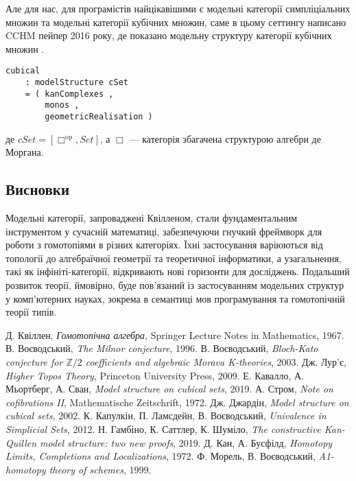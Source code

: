 \documentclass{article}
\begin{document}
Але для нас, для програмістів найцікавішими є модельні категорії симпліціальних множин та модельні категорії кубічних множин, саме в цьому сеттингу написано CCHM пейпер 2016 року, де показано модельну структуру категорії кубічних множин \cite{Cavallo19}.

\begin{lstlisting}
cubical
    : modelStructure cSet
    = ( kanComplexes ,
        monos ,
        geometricRealisation )
\end{lstlisting}

де $cSet = [\Box^{\mathrm{op}},Set]$, а $\Box$ — категорія збагачена структурою алгебри де Моргана.

\subsection{Висновки}
Модельні категорії, запроваджені Квілленом, стали фундаментальним інструментом у сучасній математиці, забезпечуючи гнучкий фреймворк для роботи з гомотопіями в різних категоріях. Їхні застосування варіюються від топології до алгебраїчної геометрії та теоретичної інформатики, а узагальнення, такі як інфініті-категорії, відкривають нові горизонти для досліджень. Подальший розвиток теорії, ймовірно, буде пов’язаний із застосуванням модельних структур у комп’ютерних науках, зокрема в семантиці мов програмування та гомотопічній теорії типів.

\begin{thebibliography}{9}
 Д. Квіллен, \emph{Гомотопічна алгебра}, Springer Lecture Notes in Mathematics, 1967.
 В. Воєводський, \emph{The Milnor conjecture}, 1996.
 В. Воєводський, \emph{Bloch-Kato conjecture for $\mathbb{Z}/2$ coefficients and algebraic Morava K-theories}, 2003.
 Дж. Лур’є, \emph{Higher Topos Theory}, Princeton University Press, 2009.
 Е. Кавалло, А. Мьортберг, А. Сван, \emph{Model structure on cubical sets}, 2019.
 А. Стром, \emph{Note on cofibrations II}, Mathematische Zeitschrift, 1972.
 Дж. Джардін, \emph{Model structure on cubical sets}, 2002.
 К. Капулкін, П. Ламсдейн, В. Воєводський, \emph{Univalence in Simplicial Sets}, 2012.
 Н. Гамбіно, К. Саттлер, К. Шуміло, \emph{The constructive Kan-Quillen model structure: two new proofs}, 2019.
 Д. Кан, А. Бусфілд, \emph{Homotopy Limits, Completions and Localizations}, 1972.
 Ф. Морель, В. Воєводський, \emph{A1-homotopy theory of schemes}, 1999.
\end{thebibliography}
\end{document}
